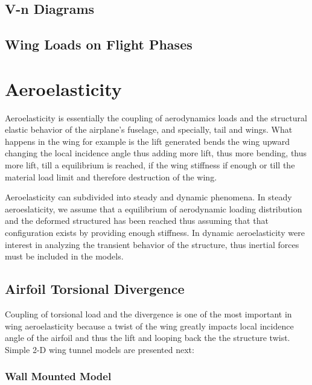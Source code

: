 \subsection{V-n Diagrams}

\subsection{Wing Loads on Flight Phases}


















\newpage
\section{Aeroelasticity}
Aeroelasticity is essentially the coupling of aerodynamics loads and the structural elastic behavior of the airplane's fuselage, and specially, tail and wings. What happens in the wing for example is the lift generated bends the wing upward changing the local incidence angle thus adding more lift, thus more bending, thus more lift, till a equilibrium is reached, if the wing stiffness if enough or till the material load limit and therefore destruction of the wing.

Aeroelasticity can subdivided into steady and dynamic phenomena. In steady
aeroeslaticity, we assume that a equilibrium of aerodynamic loading distribution and the deformed structured has been reached thus assuming that that configuration exists by providing enough stiffness.  In dynamic aeroelasticity were interest in analyzing the transient behavior of the structure, thus inertial forces must be included in the models.

\subsection{Airfoil Torsional Divergence}
Coupling of torsional load and the divergence is one of the most important in wing aeroelasticity because a twist of the wing greatly impacts local incidence angle of the airfoil and thus the lift and looping back the the structure twist.
Simple 2-D wing tunnel models are presented next:

\subsubsection{Wall Mounted Model}

